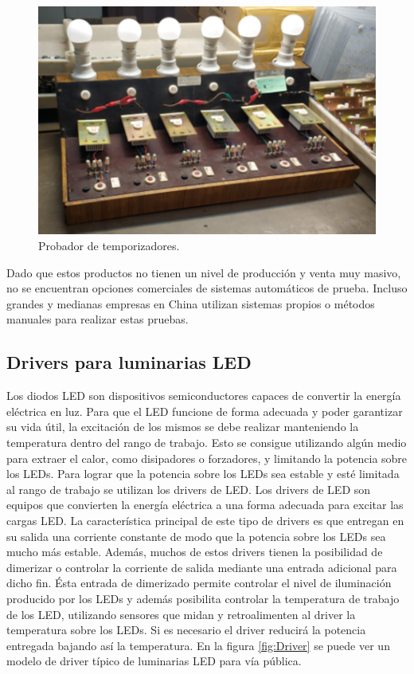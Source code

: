 \begin{figure}[ht]
	\centering
	\includegraphics[scale=.3]{./Figures/Probador.png}
	\caption{Probador de temporizadores.}
	\label{fig:Probador}
\end{figure}

Dado que estos productos no tienen un nivel de producción y venta muy masivo, no se encuentran opciones comerciales de sistemas automáticos de prueba. Incluso grandes y medianas empresas en China utilizan sistemas propios o métodos manuales para realizar estas pruebas.


\subsection{Drivers para luminarias LED}

Los diodos LED son dispositivos semiconductores capaces de convertir la energía eléctrica en luz. Para que el LED funcione de forma adecuada y poder garantizar su vida útil, la excitación de los mismos se debe realizar manteniendo la temperatura dentro del rango de trabajo. Esto se consigue utilizando algún medio para extraer el calor, como disipadores o forzadores, y limitando la potencia sobre los LEDs. Para lograr que la potencia sobre los LEDs sea estable y esté limitada al rango de trabajo se utilizan los drivers de LED. 
Los drivers de LED son equipos que convierten la energía eléctrica a una forma adecuada para excitar las cargas LED. La característica principal de este tipo de drivers es que entregan en su salida una corriente constante de modo que la potencia sobre los LEDs sea mucho más estable. Además, muchos de estos drivers tienen la posibilidad de dimerizar o controlar la corriente de salida mediante una entrada adicional para dicho fin. Ésta entrada de dimerizado permite controlar el nivel de iluminación producido por los LEDs y además posibilita controlar la temperatura de trabajo de los LED, utilizando sensores que midan y retroalimenten al driver la temperatura sobre los LEDs. Si es necesario el driver reducirá la potencia entregada bajando así la temperatura.
En la figura \ref{fig:Driver} se puede ver un modelo de driver típico de luminarias LED para vía pública.

